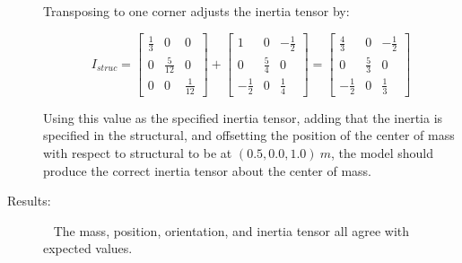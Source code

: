 \begin{description}
Transposing to one corner adjusts the inertia tensor by:

\begin{equation*}
I_{struc} = 
   \begin{bmatrix} \frac{1}{3} & 0   & 0  \\
                   0   & \frac{5}{12} & 0   \\
                   0  & 0   & \frac{1}{12} 
   \end{bmatrix}
   +
   \begin{bmatrix} 1 & 0   & -\frac{1}{2}  \\
                   0   & \frac{5}{4} & 0   \\
                   -\frac{1}{2} & 0   & \frac{1}{4} 
   \end{bmatrix}
   =
   \begin{bmatrix} \frac{4}{3} & 0   & -\frac{1}{2}  \\
                   0   & \frac{5}{3} & 0   \\
                   -\frac{1}{2} & 0   & \frac{1}{3} 
   \end{bmatrix}
\end{equation*} 

Using this value as the specified inertia tensor, adding that the inertia is 
specified in the structural, and offsetting the position of the center of mass 
with respect to structural to be at $(0.5, 0.0, 1.0)~m$, the model should 
produce the correct inertia tensor about the center of mass.

\item[Results:]\ \newline
The mass, position, orientation, and inertia tensor all agree with expected 
values.
\end{description}








